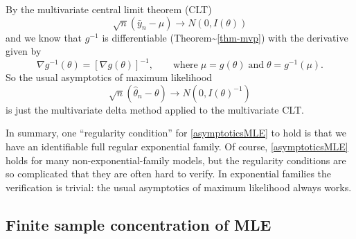 \documentclass[
]{article}
\begin{document}
By the multivariate central limit theorem (CLT) \[
  \sqrt{n}\left(\bar y_n - \mu\right) \to N\left(0, I(\theta)\right)
\] and we know that \(g^{-1}\) is differentiable
(Theorem\textasciitilde{}\ref{thm-mvp}) with the derivative given by \[
  \nabla g^{-1}(\theta) = \left[\nabla g(\theta)\right]^{-1}, \qquad \text{where} \; \mu = g(\theta) \; \text{and} \; \theta = g^{-1}(\mu).
\] So the usual asymptotics of maximum likelihood
\begin{equation} \label{asymptoticsMLE}
    \sqrt{n}\left(\hat\theta_n - \theta\right) \to N\left(0, I(\theta)^{-1}\right)
\end{equation} is just the multivariate delta method applied to the
multivariate CLT.

In summary, one ``regularity condition'' for \eqref{asymptoticsMLE} to
hold is that we have an identifiable full regular exponential family. Of
course, \eqref{asymptoticsMLE} holds for many non-exponential-family
models, but the regularity conditions are so complicated that they are
often hard to verify. In exponential families the verification is
trivial: the usual asymptotics of maximum likelihood always works.

\hypertarget{finite-sample-concentration-of-mle}{%
\subsection{Finite sample concentration of
MLE}\label{finite-sample-concentration-of-mle}}



\end{document}
